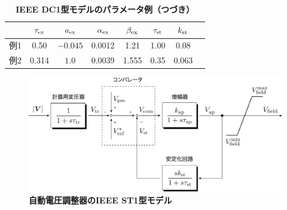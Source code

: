 \documentclass[tombow,dvipdfmx]{corona-a5-1.1}
\begin{document}
\begin{table}[h]
\medskip
 \caption{\textbf{IEEE DC1型モデルのパラメータ例（つづき）}}
 \label{table:AVRpara2}
 \centering
  \begin{tabular}{lccccccc}
   \hline
&    $\tau_{\rm ex}$ & $a_{\rm ex}$ & $\alpha_{\rm ex}$ & $\beta_{\rm ex}$ & $\tau_{\rm st}$ & $k_{\rm st}$\\
   \hline \hline
  例1 \cite[Table D.3. Unit F2]{anderson2008power}& 0.50 & $-0.045$ & 0.0012 & 1.21 & 1.00 & 0.08\\
   例2 \cite[Table 7.3]{sauer2017power}& 0.314 & $1.0$ & 0.0039 & 1.555 & 0.35 & 0.063 \\
   \hline 
  \end{tabular}
\end{table}


%

\begin{figure}[t]
\centering
\includegraphics[width = .85\linewidth]{figs/avrst1}
\medskip
\caption{\textbf{自動電圧調整器のIEEE ST1型モデル}}
\label{fig:avrst1}
\medskip
\end{figure}
\end{document}

